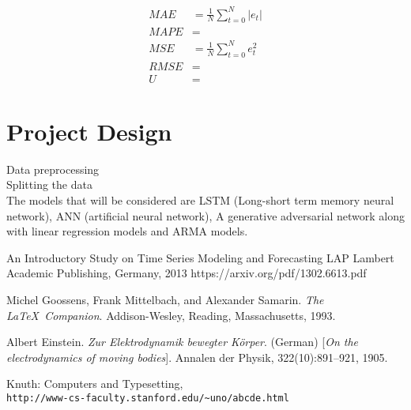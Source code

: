 \documentclass[10pt,a4paper]{article}
\begin{document}

\begin{align}
MAE &= \frac{1}{N} \sum_{t=0}^{N}|e_t| \\
MAPE &= \\
MSE &= \frac{1}{N} \sum_{t=0}^{N}e^2_t \\
RMSE &= \\
U &= 
\end{align}



\section{Project Design}


Data preprocessing\\
Splitting the data\\


The models that will be considered are LSTM (Long-short term memory neural network), ANN (artificial neural network), A generative adversarial network along with linear regression models and ARMA models.



\begin{thebibliography}{9}

An Introductory Study on Time Series Modeling and Forecasting
LAP Lambert Academic Publishing, Germany, 2013
https://arxiv.org/pdf/1302.6613.pdf

Michel Goossens, Frank Mittelbach, and Alexander Samarin. 
\textit{The \LaTeX\ Companion}. 
Addison-Wesley, Reading, Massachusetts, 1993.
 
Albert Einstein. 
\textit{Zur Elektrodynamik bewegter K{\"o}rper}. (German) 
[\textit{On the electrodynamics of moving bodies}]. 
Annalen der Physik, 322(10):891–921, 1905.
 
Knuth: Computers and Typesetting,
\\\texttt{http://www-cs-faculty.stanford.edu/\~{}uno/abcde.html}
\end{thebibliography}
\end{document}
